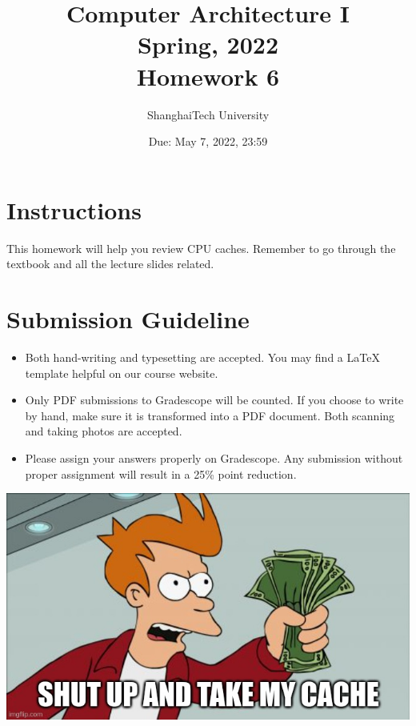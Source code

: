 \documentclass[addpoints]{exam}
\title{
    \Large{Computer Architecture I} \\
    \large{Spring, 2022}\\
    \Large{Homework 6}}
\author{ShanghaiTech University}
\date{Due: May 7, 2022, 23:59}
\begin{document}
\maketitle

\section*{Instructions}
This homework will help you review CPU caches. Remember to go through
the textbook and all the lecture slides related.
\section*{Submission Guideline}
\begin{itemize}
    \item Both hand-writing and typesetting are accepted. You may find
    a LaTeX template helpful on our course website.
    \item Only PDF submissions to Gradescope will be counted. If you
    choose to write by hand, make sure it is transformed into a PDF
    document. Both scanning and taking photos are accepted.
    \item Please assign your answers properly on Gradescope. Any
    submission without proper assignment will result in a 25\% point
    reduction.
\end{itemize}

\begin{center}
    \includegraphics[width=\textwidth]{img/meme1.jpg}
\end{center}

\newpage


\newpage

\newpage


\end{document}
